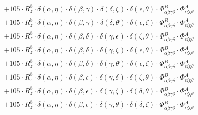 \documentclass{article}
\begin{document}
\begin{equation}
\begin{array}{c}
 \\[0.2em] 		 + 105 \cdot R_{z}^{8} \cdot \delta{}\left(\alpha{}, \eta{}\right) \cdot \delta{}\left(\beta{}, \gamma{}\right) \cdot \delta{}\left(\delta{}, \zeta{}\right) \cdot \delta{}\left(\epsilon{}, \theta{}\right) \cdot \Phi{}^{B}_{\alpha{}\beta{}\gamma{}\delta{}} \cdot \Phi{}^{A}_{\epsilon{}\zeta{}\eta{}\theta{}} 
 \\[0.2em] 		 + 105 \cdot R_{z}^{8} \cdot \delta{}\left(\alpha{}, \eta{}\right) \cdot \delta{}\left(\beta{}, \gamma{}\right) \cdot \delta{}\left(\delta{}, \theta{}\right) \cdot \delta{}\left(\epsilon{}, \zeta{}\right) \cdot \Phi{}^{B}_{\alpha{}\beta{}\gamma{}\delta{}} \cdot \Phi{}^{A}_{\epsilon{}\zeta{}\eta{}\theta{}} 
 \\[0.2em] 		 + 105 \cdot R_{z}^{8} \cdot \delta{}\left(\alpha{}, \eta{}\right) \cdot \delta{}\left(\beta{}, \delta{}\right) \cdot \delta{}\left(\gamma{}, \epsilon{}\right) \cdot \delta{}\left(\zeta{}, \theta{}\right) \cdot \Phi{}^{B}_{\alpha{}\beta{}\gamma{}\delta{}} \cdot \Phi{}^{A}_{\epsilon{}\zeta{}\eta{}\theta{}} 
 \\[0.2em] 		 + 105 \cdot R_{z}^{8} \cdot \delta{}\left(\alpha{}, \eta{}\right) \cdot \delta{}\left(\beta{}, \delta{}\right) \cdot \delta{}\left(\gamma{}, \zeta{}\right) \cdot \delta{}\left(\epsilon{}, \theta{}\right) \cdot \Phi{}^{B}_{\alpha{}\beta{}\gamma{}\delta{}} \cdot \Phi{}^{A}_{\epsilon{}\zeta{}\eta{}\theta{}} 
 \\[0.2em] 		 + 105 \cdot R_{z}^{8} \cdot \delta{}\left(\alpha{}, \eta{}\right) \cdot \delta{}\left(\beta{}, \delta{}\right) \cdot \delta{}\left(\gamma{}, \theta{}\right) \cdot \delta{}\left(\epsilon{}, \zeta{}\right) \cdot \Phi{}^{B}_{\alpha{}\beta{}\gamma{}\delta{}} \cdot \Phi{}^{A}_{\epsilon{}\zeta{}\eta{}\theta{}} 
 \\[0.2em] 		 + 105 \cdot R_{z}^{8} \cdot \delta{}\left(\alpha{}, \eta{}\right) \cdot \delta{}\left(\beta{}, \epsilon{}\right) \cdot \delta{}\left(\gamma{}, \delta{}\right) \cdot \delta{}\left(\zeta{}, \theta{}\right) \cdot \Phi{}^{B}_{\alpha{}\beta{}\gamma{}\delta{}} \cdot \Phi{}^{A}_{\epsilon{}\zeta{}\eta{}\theta{}} 
 \\[0.2em] 		 + 105 \cdot R_{z}^{8} \cdot \delta{}\left(\alpha{}, \eta{}\right) \cdot \delta{}\left(\beta{}, \epsilon{}\right) \cdot \delta{}\left(\gamma{}, \zeta{}\right) \cdot \delta{}\left(\delta{}, \theta{}\right) \cdot \Phi{}^{B}_{\alpha{}\beta{}\gamma{}\delta{}} \cdot \Phi{}^{A}_{\epsilon{}\zeta{}\eta{}\theta{}} 
 \\[0.2em] 		 + 105 \cdot R_{z}^{8} \cdot \delta{}\left(\alpha{}, \eta{}\right) \cdot \delta{}\left(\beta{}, \epsilon{}\right) \cdot \delta{}\left(\gamma{}, \theta{}\right) \cdot \delta{}\left(\delta{}, \zeta{}\right) \cdot \Phi{}^{B}_{\alpha{}\beta{}\gamma{}\delta{}} \cdot \Phi{}^{A}_{\epsilon{}\zeta{}\eta{}\theta{}} 

\end{array}
\end{equation}
\end{document}
